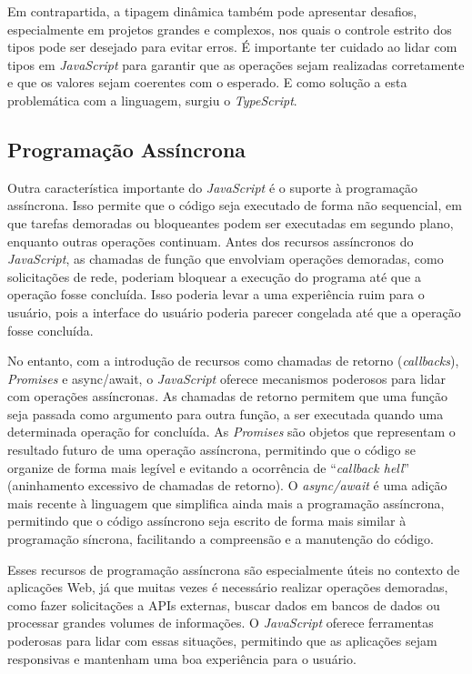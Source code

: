 Em contrapartida, a tipagem dinâmica também pode apresentar desafios, especialmente em projetos grandes e complexos, nos quais o controle estrito dos tipos pode ser desejado para evitar erros. É importante ter cuidado ao lidar com tipos em \textit{JavaScript} para garantir que as operações sejam realizadas corretamente e que os valores sejam coerentes com o esperado. E como solução a esta problemática com a linguagem, surgiu o \textit{TypeScript}.

\subsection{Programação Assíncrona}

Outra característica importante do \textit{JavaScript} é o suporte à programação assíncrona. Isso permite que o código seja executado de forma não sequencial, em que tarefas demoradas ou bloqueantes podem ser executadas em segundo plano, enquanto outras operações continuam. Antes dos recursos assíncronos do \textit{JavaScript}, as chamadas de função que envolviam operações demoradas, como solicitações de rede, poderiam bloquear a execução do programa até que a operação fosse concluída. Isso poderia levar a uma experiência ruim para o usuário, pois a interface do usuário poderia parecer congelada até que a operação fosse concluída.

No entanto, com a introdução de recursos como chamadas de retorno (\textit{callbacks}), \textit{Promises} e async/await, o \textit{JavaScript} oferece mecanismos poderosos para lidar com operações assíncronas. As chamadas de retorno permitem que uma função seja passada como argumento para outra função, a ser executada quando uma determinada operação for concluída. As \textit{Promises} são objetos que representam o resultado futuro de uma operação assíncrona, permitindo que o código se organize de forma mais legível e evitando a ocorrência de ``\textit{callback hell}'' (aninhamento excessivo de chamadas de retorno). O \textit{async/await} é uma adição mais recente à linguagem que simplifica ainda mais a programação assíncrona, permitindo que o código assíncrono seja escrito de forma mais similar à programação síncrona, facilitando a compreensão e a manutenção do código.

Esses recursos de programação assíncrona são especialmente úteis no contexto de aplicações Web, já que muitas vezes é necessário realizar operações demoradas, como fazer solicitações a APIs externas, buscar dados em bancos de dados ou processar grandes volumes de informações. O \textit{JavaScript} oferece ferramentas poderosas para lidar com essas situações, permitindo que as aplicações sejam responsivas e mantenham uma boa experiência para o usuário.

